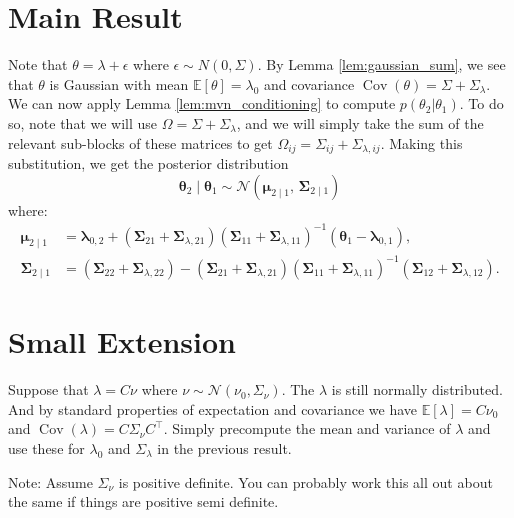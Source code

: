 \documentclass{article}
\newcommand{\E}{\mathbb{E}}
\newcommand{\cov}{\operatorname{Cov}}
\begin{document}
\section*{Main Result}
Note that $\theta = \lambda + \epsilon$ where $\epsilon \sim N(0, \Sigma)$. By Lemma \ref{lem:gaussian_sum}, we see that $\theta$ is Gaussian with mean $\E[\theta] = \lambda_0$ and covariance $\cov(\theta) = \Sigma + \Sigma_\lambda$. We can now apply Lemma \ref{lem:mvn_conditioning} to compute $p(\theta_2|\theta_1)$. To do so, note that we will use $\Omega = \Sigma + \Sigma_\lambda$, and we will simply take the sum of the relevant sub-blocks of these matrices to get $\Omega_{ij} = \Sigma_{ij} + \Sigma_{\lambda, ij}$. 
Making this substitution, we get the posterior distribution
\begin{equation}
    \boldsymbol{\theta}_2 \mid \boldsymbol{\theta}_1 \sim \mathcal{N}\left( \boldsymbol{\mu}_{2 \mid 1}, \, \boldsymbol{\Sigma}_{2 \mid 1} \right)
\end{equation}
where:
\begin{align}
    \boldsymbol{\mu}_{2 \mid 1} &= \boldsymbol{\lambda}_{0,2} + (\boldsymbol{\Sigma}_{21} + \boldsymbol{\Sigma}_{\lambda,21}) (\boldsymbol{\Sigma}_{11} + \boldsymbol{\Sigma}_{\lambda,11})^{-1} (\boldsymbol{\theta}_1 - \boldsymbol{\lambda}_{0,1}), \\
    \boldsymbol{\Sigma}_{2 \mid 1} &= (\boldsymbol{\Sigma}_{22} + \boldsymbol{\Sigma}_{\lambda,22}) - (\boldsymbol{\Sigma}_{21} + \boldsymbol{\Sigma}_{\lambda,21}) (\boldsymbol{\Sigma}_{11} + \boldsymbol{\Sigma}_{\lambda,11})^{-1} (\boldsymbol{\Sigma}_{12} + \boldsymbol{\Sigma}_{\lambda,12}).
\end{align}

\section*{Small Extension}
Suppose that $\lambda = C\nu$ where $\nu \sim \mathcal{N}(\nu_0, \Sigma_{\nu})$. The $\lambda$ is still normally distributed. And by standard properties of expectation and covariance we have $\E[\lambda] = C\nu_0$ and $\cov(\lambda) = C\Sigma_{\nu} C^\top$. Simply precompute the mean and variance of $\lambda$ and use these for $\lambda_0$ and $\Sigma_\lambda$ in the previous result.  

Note: Assume $\Sigma_{\nu}$ is positive definite. You can probably work this all out about the same if things are positive semi definite. 
\end{document}
